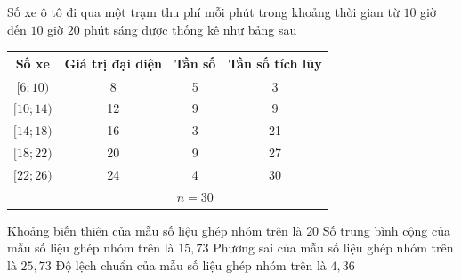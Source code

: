 \begin{ex}%
	Số xe ô tô đi qua một trạm thu phí mỗi phút trong khoảng thời gian từ $10$ giờ đến $10$ giờ $20$ phút sáng được thống kê như bảng sau
	\begin{center}
		\begin{tabular}{|c|c|c|c|}
			\hline Số xe & Giá trị đại diện & Tần số & Tần số tích lũy \\
			\hline$[6 ; 10)$ & 8 & 5 & 3 \\
			\hline$[10 ; 14)$ & 12 & 9 & 9 \\
			\hline$[14 ; 18)$ & 16 & 3 & 21 \\
			\hline$[18 ; 22)$ & 20 & 9 & 27 \\
			\hline$[22 ; 26)$ & 24 & 4 & 30 \\
			\hline & & $n=30$ & \\
			\hline
		\end{tabular}
	\end{center}
	\choiceTF
	{\True Khoảng biến thiên của mẫu số liệu ghép nhóm trên là $20$}
	{\True Số trung bình cộng của mẫu số liệu ghép nhóm trên là $15{,}73$}
	{Phương sai của mẫu số liệu ghép nhóm trên là $25{,}73$}
	{Độ lệch chuẩn của mẫu số liệu ghép nhóm trên là $4{,}36$}
\end{ex}


